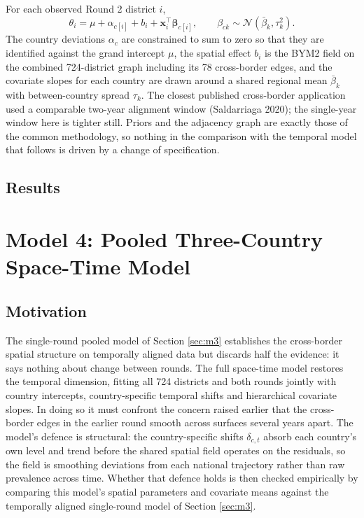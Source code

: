 \documentclass{article}
\begin{document}
For each observed Round 2 district \(i\), \begin{equation}
\theta_i = \mu + \alpha_{c[i]} + b_i + \mathbf{x}_i^{\top}\bm{\beta}_{c[i]},
\qquad
\beta_{ck} \sim \mathcal{N}(\bar{\beta}_k, \tau_k^2).
\end{equation} The country deviations \(\alpha_c\) are constrained to
sum to zero so that they are identified against the grand intercept
\(\mu\), the spatial effect \(b_i\) is the BYM2 field on the combined
724-district graph including its 78 cross-border edges, and the
covariate slopes for each country are drawn around a shared regional
mean \(\bar{\beta}_k\) with between-country spread \(\tau_k\). The
closest published cross-border application used a comparable two-year
alignment window (Saldarriaga 2020); the single-year window here is
tighter still. Priors and the adjacency graph are exactly those of the
common methodology, so nothing in the comparison with the temporal model
that follows is driven by a change of specification.

\subsection{Results}\label{results-2}

\section{Model 4: Pooled Three-Country Space-Time Model}\label{sec:m4}

\subsection{Motivation}\label{motivation-1}

The single-round pooled model of Section \ref{sec:m3} establishes the
cross-border spatial structure on temporally aligned data but discards
half the evidence: it says nothing about change between rounds. The full
space-time model restores the temporal dimension, fitting all 724
districts and both rounds jointly with country intercepts,
country-specific temporal shifts and hierarchical covariate slopes. In
doing so it must confront the concern raised earlier that the
cross-border edges in the earlier round smooth across surfaces several
years apart. The model's defence is structural: the country-specific
shifts \(\delta_{c,t}\) absorb each country's own level and trend before
the shared spatial field operates on the residuals, so the field is
smoothing deviations from each national trajectory rather than raw
prevalence across time. Whether that defence holds is then checked
empirically by comparing this model's spatial parameters and covariate
means against the temporally aligned single-round model of Section
\ref{sec:m3}.
\end{document}
